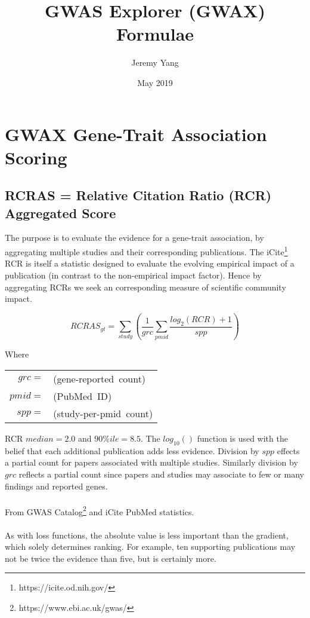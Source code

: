 \documentclass[12pt]{extarticle}
\title{GWAS Explorer (GWAX) Formulae}
\author{Jeremy Yang}
\date{May 2019}
\begin{document}
\maketitle

\section{GWAX Gene-Trait Association Scoring}
\subsection{RCRAS =  Relative Citation Ratio (RCR) Aggregated Score}

The purpose is to evaluate the evidence for a gene-trait association, by aggregating multiple studies and their corresponding publications. The iCite\footnote{https://icite.od.nih.gov/} RCR is itself a statistic designed to evaluate the evolving empirical impact of a publication (in contrast to the non-empirical impact factor). Hence by aggregating RCRs we seek an corresponding measure of scientific community impact.
 
\begin{equation} RCRAS_{gt} = \sum_{study} \left(\frac{1}{grc} \sum_{pmid} \frac{log_{2}(RCR) + 1}{spp}\right)
\end{equation}

Where \\
\begin{center}
\begin{tabular}{ r l }
	$grc =$ &\mbox{(gene-reported count)}	\\
	$pmid =$ &\mbox{(PubMed ID)}	\\
	$spp =$ &\mbox{(study-per-pmid count)}	\\
\end{tabular}
\end{center}

RCR $median = 2.0$ and $90\%ile = 8.5$. The $log_{10}()$ function is used with the belief that each additional publication adds less evidence. Division by $spp$ effects a partial count for papers associated with multiple studies. Similarly division by $grc$ reflects a partial count since papers and studies may associate to few or many findings and reported genes. \\
\\
From GWAS Catalog\footnote{https://www.ebi.ac.uk/gwas/} and iCite PubMed statistics. \\
\\
As with loss functions, the absolute value is less important than the gradient, which solely determines ranking. For example, ten supporting publications may not be twice the evidence than five, but is certainly more.
\end{document}
